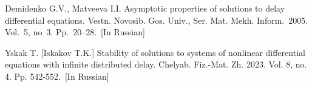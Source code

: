 \documentclass[12pt]{llncs}
\begin{document}
\begin{thebibliography}{9} %

 Demidenko G.V., Matveeva I.I. Asymptotic properties of solutions to delay differential equations.
 Vestn. Novosib. Gos. Univ., Ser. Mat. Mekh. Inform.~2005. Vol.~5, no~3. Pp.~20--28.~[In Russian]

 Yskak T. [Iskakov T.K.] Stability of solutions to systems of nonlinear differential equations with infinite distributed delay.
 Chelyab. Fiz.-Mat. Zh. 2023. Vol. 8, no. 4. Pp. 542-552.~[In Russian]







\end{thebibliography}
\end{document}
